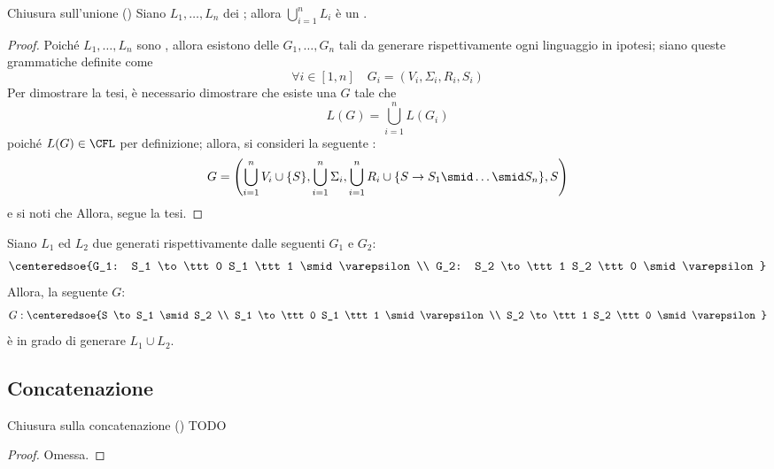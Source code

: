 \documentclass[a4paper, 12pt]{report}
\begin{document}
    \begin{framedprop}{Chiusura sull'unione (\CFL)}
        Siano $L_1, \ldots, L_n$ dei \CFL; allora $\displaystyle \bigcup_{i =1}^n{L_i}$ è un \CFL.
    \end{framedprop}

    \begin{proof}
        Poiché $L_1, \ldots, L_n$ sono \CFL, allora esistono delle \CFG $G_1, \ldots, G_n$ tali da generare rispettivamente ogni linguaggio in ipotesi; siano queste grammatiche definite come $$\forall i \in [1, n] \quad G_i = (V_i, \Sigma_i, R_i, S_i)$$ Per dimostrare la tesi, è necessario dimostrare che esiste una \CFG $G$ tale che $$L(G) = \bigcup_{i = 1}^n{L(G_i)}$$ poiché $L(G)\in \mathrm{\CFL}$ per definizione; allora, si consideri la seguente \CFG: $$\displaystyle G = \left( \bigcup_{i = 1}^n{V_i} \cup \{S\}, \bigcup_{i = 1}^n{\Sigma_i}, \bigcup_{i = 1}^n{R_i} \cup \{S \rightarrow S_1 \smid \ldots \smid S_n\}, S \right)$$ e si noti che  Allora, segue la tesi.
    \end{proof}

    \begin{example}
        Siano $L_1$ ed $L_2$ due \CFL generati rispettivamente dalle seguenti \CFG $G_1$ e $G_2$: $$\centeredsoe{G_1: S_1 \to \ttt 0 S_1 \ttt 1 \smid \varepsilon \\ G_2: S_2 \to \ttt 1 S_2 \ttt 0 \smid \varepsilon}$$ Allora, la seguente \CFG $G$: $$G: \centeredsoe{S \to S_1 \smid S_2 \\ S_1 \to \ttt 0 S_1 \ttt 1 \smid \varepsilon \\ S_2 \to \ttt 1 S_2 \ttt 0 \smid \varepsilon }$$ è in grado di generare $L_1 \cup L_2$.
    \end{example}

    \subsection{Concatenazione}

    \begin{framedprop}{Chiusura sulla concatenazione (\CFL)}
        TODO
    \end{framedprop}

    \begin{proof}
        Omessa.
    \end{proof}
\end{document}
